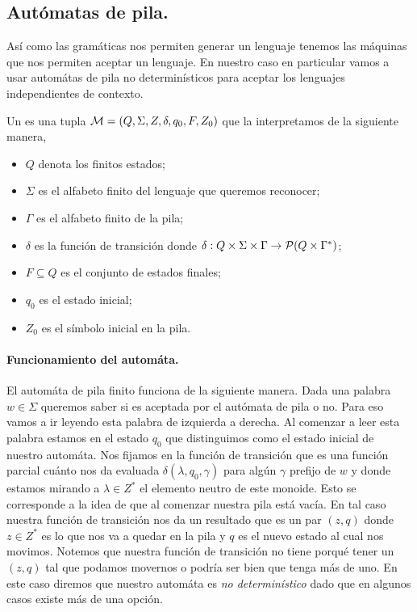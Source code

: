 \documentclass[tesis.tex]{subfiles}
\begin{document}
\subsection{Autómatas de pila.}
Así como las gramáticas nos permiten generar un lenguaje tenemos las máquinas que nos permiten aceptar un lenguaje. En nuestro caso en particular vamos a usar automátas de pila no determinísticos para aceptar los lenguajes independientes de contexto.

\begin{deff}
	Un  es una tupla ${\cal M } = (Q, \Sigma, Z, \delta, q_0, F, Z_0)$ que la interpretamos de la siguiente manera,
	\begin{itemize}
		\item $Q$ denota los finitos estados;
		\item $\Sigma$ es el alfabeto finito del lenguaje que queremos reconocer;
		\item $\Gamma$ es el alfabeto finito de la pila;
		\item $\delta$ es la función de transición donde $\delta: Q  \times \Sigma \times \Gamma \to {\cal P}( Q  \times \Gamma^*)$;
		\item $F \subseteq Q$ es el conjunto de estados finales;
		\item $q_0$ es el estado inicial;
		\item $Z_0$ es el símbolo inicial en la pila.
	\end{itemize}
\end{deff}


\paragraph{Funcionamiento del automáta.}

El automáta de pila finito funciona de la siguiente manera. Dada una palabra $w \in \Sigma$ queremos saber si es aceptada por el autómata de pila o no. Para eso vamos a ir leyendo esta palabra de izquierda a derecha. Al comenzar a leer esta palabra estamos en el estado $q_0$ que distinguimos como el estado inicial de nuestro automáta. Nos fijamos en la función de transición que es una función parcial cuánto nos da evaluada  $\delta(\lambda,q_0,\gamma)$ para algún $\gamma$ prefijo de $w$ y donde estamos mirando a $\lambda \in Z^*$ el elemento neutro de este monoide. Esto se corresponde a la idea de que al comenzar nuestra pila está vacía. En tal caso nuestra función de transición nos da un resultado que es un par $(z,q)$ donde $z \in Z^{*}$ es lo que nos va a quedar en la pila y $q$ es el nuevo estado al cual nos movimos. Notemos que nuestra función de transición no tiene porqué tener un $(z,q)$ tal que podamos movernos o podría ser bien que tenga más de uno. En este caso diremos que nuestro automáta es \textit{no determinístico} dado que en algunos casos existe más de una opción.
\end{document}
